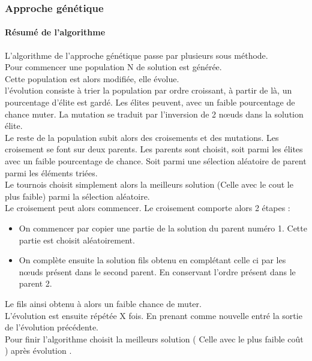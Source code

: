 \documentclass[10pt,a4paper]{report}
\begin{document}
	\subsubsection{Approche génétique}
		\paragraph{Résumé de l'algorithme\\}
		\begin{flushleft}
		L'algorithme de l'approche génétique passe par plusieurs sous méthode. \\
		Pour commencer une population N de solution est générée. \\
		Cette population est alors modifiée, elle évolue. \\
		l'évolution consiste à trier la population par ordre croissant, à partir de là, un pourcentage d'élite est gardé. Les élites peuvent, avec un faible pourcentage de chance muter. La mutation se traduit par l'inversion de 2 nœuds dans la solution élite. \\
		Le reste de la population subit alors des croisements et des mutations. Les croisement se font sur deux parents. Les parents sont choisit, soit parmi les élites avec un faible pourcentage de chance. Soit parmi une sélection aléatoire de parent parmi les éléments triées. \\
		Le tournois choisit simplement alors la meilleurs solution (Celle avec le cout le plus faible) parmi la sélection aléatoire. \\
		
		Le croisement peut alors commencer. Le croisement comporte alors 2 étapes :
		\begin{itemize}
			\item On commencer par copier une partie de la solution du parent numéro 1. Cette partie est choisit aléatoirement.
			\item On complète ensuite la solution fils obtenu en complétant celle ci par les nœuds présent dans le second parent. En conservant l'ordre présent dans le parent 2.
		\end{itemize}
		Le fils ainsi obtenu à alors un faible chance de muter. \\
		
		L'évolution est ensuite répétée X fois. En prenant comme nouvelle entré la sortie de l'évolution précédente. \\
		Pour finir l'algorithme choisit la meilleurs solution ( Celle avec le plus faible coût ) après évolution . \\
		\end{flushleft}
		
\end{document}
